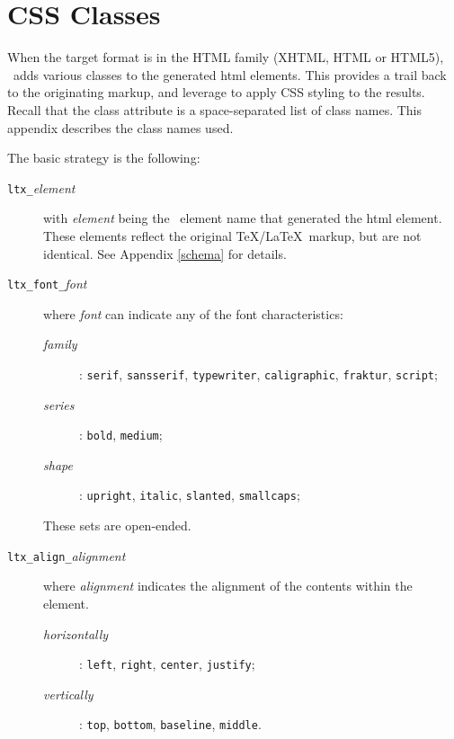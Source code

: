 \documentclass{book}
\begin{document}
\chapter{CSS Classes}\label{cssclasses}
When the target format is in the HTML family (XHTML, HTML or HTML5),
\LaTeXML\ adds various classes to the generated html elements.
This provides a trail back to the originating markup,
and leverage to apply CSS styling to the results.
Recall that the class attribute is a space-separated list of class names.
This appendix describes the class names used.

The basic strategy is the following:
\begin{description}
\item[\texttt{ltx\_}\textit{element}] with \textit{element} being the \LaTeXML\ element name
  that generated the html element.
  These elements reflect the original \TeX/\LaTeX\ markup, but are
  not identical. See Appendix \ref{schema} for details.
\item[\texttt{ltx\_font\_}\textit{font}] where \textit{font} can indicate any 
  of the font characteristics:
  \begin{description}
    \item[\textit{family}]:  \texttt{serif}, \texttt{sansserif}, \texttt{typewriter},
      \texttt{caligraphic}, \texttt{fraktur}, \texttt{script};
    \item[\textit{series}]:  \texttt{bold}, \texttt{medium};
    \item[\textit{shape}]:   \texttt{upright}, \texttt{italic}, \texttt{slanted}, \texttt{smallcaps};
  \end{description}
  These sets are open-ended.
\item[\texttt{ltx\_align\_}\textit{alignment}] where \textit{alignment}
  indicates the alignment of the contents within the element.
  \begin{description}
    \item[\textit{horizontally}]: \texttt{left}, \texttt{right}, \texttt{center}, \texttt{justify};
    \item[\textit{vertically}]:   \texttt{top}, \texttt{bottom}, \texttt{baseline}, \texttt{middle}.

\end{description}
\end{description}
\end{document}
